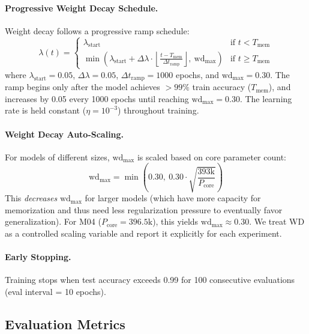 \documentclass[11pt]{article}
\newcommand{\Tmem}{T_{\mathrm{mem}}}
\newcommand{\wdmax}{\mathrm{wd}_{\max}}
\newcommand{\Pcore}{P_{\mathrm{core}}}
\begin{document}
\paragraph{Progressive Weight Decay Schedule.} Weight decay follows a progressive ramp schedule:
\begin{equation}
    \lambda(t) = \begin{cases}
        \lambda_{\mathrm{start}} & \text{if } t < \Tmem \\
        \min\!\left(\lambda_{\mathrm{start}} + \Delta\lambda \cdot \left\lfloor\frac{t - \Tmem}{\Delta t_{\mathrm{ramp}}}\right\rfloor,\ \wdmax\right) & \text{if } t \geq \Tmem
    \end{cases}
    \label{eq:wd_schedule}
\end{equation}
where $\lambda_{\mathrm{start}} = 0.05$, $\Delta\lambda = 0.05$, $\Delta t_{\mathrm{ramp}} = 1000$ epochs, and $\wdmax = 0.30$. The ramp begins only after the model achieves $>99\%$ train accuracy ($\Tmem$), and increases by 0.05 every 1000 epochs until reaching $\wdmax = 0.30$. The learning rate is held constant ($\eta = 10^{-3}$) throughout training.

\paragraph{Weight Decay Auto-Scaling.} For models of different sizes, $\wdmax$ is scaled based on core parameter count:
\begin{equation}
    \wdmax = \min\!\left(0.30,\ 0.30 \cdot \sqrt{\frac{393\text{k}}{\Pcore}}\right)
    \label{eq:wd_auto}
\end{equation}
This \emph{decreases} $\wdmax$ for larger models (which have more capacity for memorization and thus need less regularization pressure to eventually favor generalization). For M04 ($\Pcore = 396.5\text{k}$), this yields $\wdmax \approx 0.30$. We treat WD as a controlled scaling variable and report it explicitly for each experiment.

\paragraph{Early Stopping.} Training stops when test accuracy exceeds 0.99 for 100 consecutive evaluations (eval interval = 10 epochs).

\subsection{Evaluation Metrics}
\end{document}

